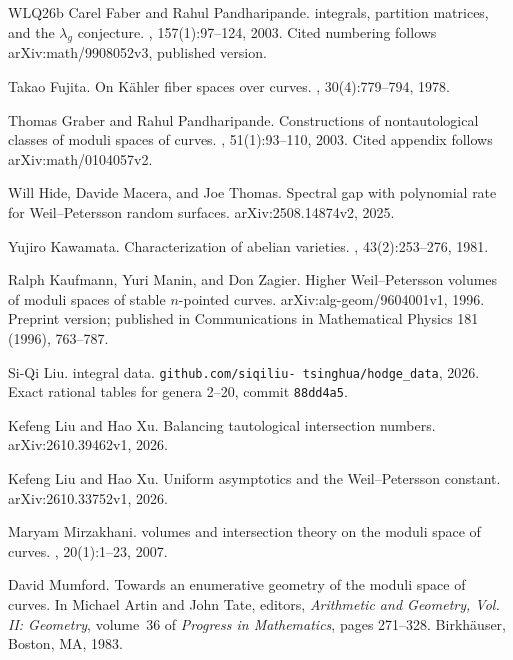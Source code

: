 \documentclass[a4paper,10pt]{article}
\numberwithin{equation}{section}
\theoremstyle{paperplain}
\theoremstyle{paperremark}
\theoremstyle{paperplain}
\begin{document}
\begin{thebibliography}{WLQ{\etalchar{+}}26b}
Carel Faber and Rahul Pandharipande.
 integrals, partition matrices, and the {$\lambda_g$}
  conjecture.
, 157(1):97--124, 2003.
\newblock Cited numbering follows arXiv:math/9908052v3, published version.

Takao Fujita.
\newblock On {K{\"a}hler} fiber spaces over curves.
, 30(4):779--794,
  1978.

Thomas Graber and Rahul Pandharipande.
\newblock Constructions of nontautological classes of moduli spaces of curves.
, 51(1):93--110, 2003.
\newblock Cited appendix follows arXiv:math/0104057v2.

Will Hide, Davide Macera, and Joe Thomas.
\newblock Spectral gap with polynomial rate for {Weil--Petersson} random
  surfaces.
\newblock arXiv:2508.14874v2, 2025.

Yujiro Kawamata.
\newblock Characterization of abelian varieties.
, 43(2):253--276, 1981.

Ralph Kaufmann, Yuri Manin, and Don Zagier.
\newblock Higher {Weil--Petersson} volumes of moduli spaces of stable
  {$n$}-pointed curves.
\newblock arXiv:alg-geom/9604001v1, 1996.
\newblock Preprint version; published in Communications in Mathematical Physics
  181 (1996), 763--787.

Si-Qi Liu.
 integral data.
\newblock \texttt{github.com/\allowbreak siqiliu-\allowbreak
  tsinghua/\allowbreak hodge\_data}, 2026.
\newblock Exact rational tables for genera 2--20, commit \texttt{88dd4a5}.

Kefeng Liu and Hao Xu.
\newblock Balancing tautological intersection numbers.
\newblock arXiv:2610.39462v1, 2026.

Kefeng Liu and Hao Xu.
\newblock Uniform asymptotics and the {Weil--Petersson} constant.
\newblock arXiv:2610.33752v1, 2026.

Maryam Mirzakhani.
 volumes and intersection theory on the moduli space
  of curves.
, 20(1):1--23,
  2007.

David Mumford.
\newblock Towards an enumerative geometry of the moduli space of curves.
\newblock In Michael Artin and John Tate, editors, {\em Arithmetic and
  Geometry, {Vol. II}: Geometry}, volume~36 of {\em Progress in Mathematics},
  pages 271--328. Birkh{\"a}user, Boston, MA, 1983.


\end{thebibliography}
\end{document}
